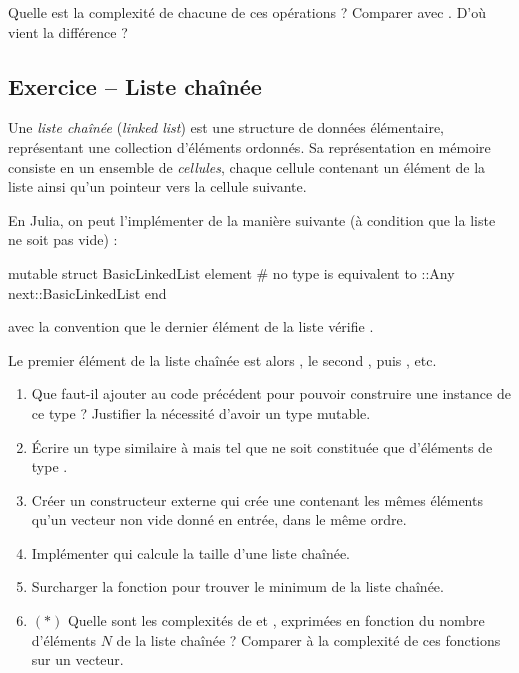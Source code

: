 \documentclass{article}
\newcounter{loop}
\newcounter{numEx}
\newcommand{\exo}[1]{
	\stepcounter{numEx}
	\setcounter{loop}{0}
	\subsection*{Exercice \arabic{numEx} -- #1}
}
\newenvironment{repl}{\vspace{-0.6em}\VerbatimEnvironment\begin{jlrepl}}{\end{jlrepl}}
\begin{document}
Quelle est la complexité de chacune de ces opérations ? Comparer avec . D'où vient la différence ?

\exo{Liste chaînée}

Une \emph{liste chaînée} (\textit{linked list}) est une structure de données élémentaire, représentant une collection d'éléments ordonnés. Sa représentation en mémoire consiste en un ensemble de \emph{cellules}, chaque cellule contenant un élément de la liste ainsi qu'un pointeur vers la cellule suivante.

En Julia, on peut l'implémenter de la manière suivante (à condition que la liste ne soit pas vide) :
\begin{repl}
	mutable struct BasicLinkedList
		element  # no type is equivalent to ::Any
		next::BasicLinkedList
	end
\end{repl}
avec la convention que le dernier élément  de la liste vérifie .

Le premier élément de la liste chaînée  est alors , le second , puis , etc.

\begin{enumerate}
	\item Que faut-il ajouter au code précédent pour pouvoir construire une instance de ce type ? Justifier la nécessité d'avoir un type mutable.

	\item Écrire un type  similaire à  mais tel que  ne soit constituée que d'éléments de type .

	\item Créer un constructeur externe  qui crée une  contenant les mêmes éléments qu'un vecteur  non vide donné en entrée, dans le même ordre.

	\item Implémenter  qui calcule la taille d'une liste chaînée.

	\item Surcharger la fonction  pour trouver le minimum de la liste chaînée.

	\item $(*)$ Quelle sont les complexités de  et , exprimées en fonction du nombre d'éléments $N$ de la liste chaînée ? Comparer à la complexité de ces fonctions sur un vecteur.
\end{enumerate}
\end{document}

